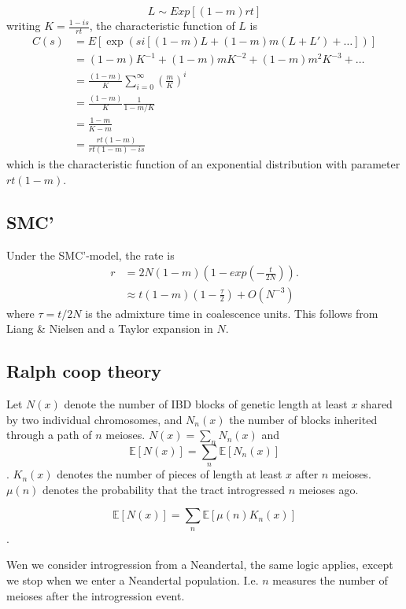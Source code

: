 \documentclass[10pt,a4paper]{article}
\newcommand{\BE}[1]{\mathbb{E}\left[#1\right]}
\begin{document}
\begin{equation}
L \sim Exp[(1-m)rt]
\end{equation}
writing $K = \frac{1-is}{rt}$, the characteristic function of $L$ is
\begin{align}
C(s) &= E[\exp(si [(1-m)L + (1-m)m (L+L')+ \dots  ] )]\nonumber\\
&=(1-m) K^{-1} + (1-m)m K^{-2} +(1-m)m^2 K^{-3} + \dots\nonumber\\
&=\frac{(1-m)}{K} \sum_{i=0}^\infty \left(\frac{m}{K}\right)^{i} \nonumber\\
&= \frac{(1-m)}{K} \frac{1}{1 - m/K}\nonumber\\
&= \frac{1-m}{K-m}\nonumber\\
&= \frac{rt(1-m)}{rt (1-m) - is}\nonumber
\end{align}
which is the characteristic function of an exponential distribution with parameter $rt(1-m)$.

\subsection{SMC'}
Under the SMC'-model, the rate is 
\begin{align}
r &= 2 N (1-m) \left(1 - exp\left({-\frac{t}{2N}}\right)\right).\\
& \approx t (1-m) \left( 1- \frac{\tau}{2}\right) + O\left(N^{-3}\right)
\end{align}
where $\tau = t/2N$ is the admixture time in coalescence units. This follows from Liang \& Nielsen and a Taylor expansion in $N$.


\subsection{Ralph coop theory}
Let $N(x)$ denote the number of IBD blocks of genetic length at least $x$ shared by two individual chromosomes, and $N_n(x)$ the number of blocks inherited through a path of $n$ meioses. $N(x) = \sum_n N_n(x)$ and
$$\BE{N(x)} = \sum_n \BE{N_n(x)}$$. $K_n(x)$ denotes the number of pieces of length at least $x$ after $n$ meioses. $\mu(n)$ denotes the probability that the tract introgressed $n$ meioses ago. 

$$\BE{N(x)} = \sum_n \BE{\mu(n) K_n (x)}$$.

Wen we consider introgression from a Neandertal, the same logic applies, except we stop when we enter a Neandertal population. I.e. $n$ measures the number of meioses after the introgression event.
\end{document}
